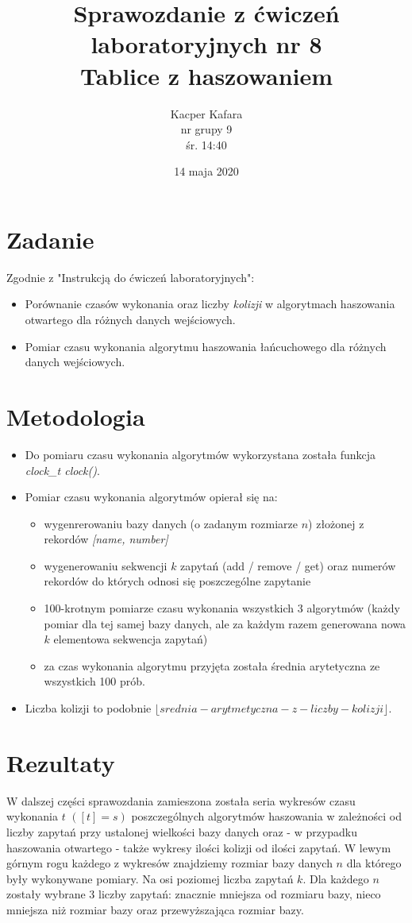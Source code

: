 \documentclass{article}
\title{Sprawozdanie z ćwiczeń laboratoryjnych nr 8\\Tablice z haszowaniem}
\author{Kacper Kafara\\nr grupy 9\\śr. 14:40}
\date{14 maja 2020}
\begin{document}
\maketitle
\newpage

\section{Zadanie}
Zgodnie z "Instrukcją do ćwiczeń laboratoryjnych":
\begin{itemize}
	\item Porównanie czasów wykonania oraz liczby \emph{kolizji} w algorytmach haszowania otwartego dla różnych danych wejściowych. 
	\item Pomiar czasu wykonania algorytmu haszowania łańcuchowego dla różnych danych wejściowych.
\end{itemize}

\section{Metodologia}
\begin{itemize}
	\item Do pomiaru czasu wykonania algorytmów wykorzystana została funkcja \emph{clock\_t clock()}. 
	\item Pomiar czasu wykonania algorytmów opierał się na: 
	\begin{itemize}
		\item wygenrerowaniu bazy danych (o zadanym rozmiarze $n$) złożonej z rekordów \emph{[name, number]}
		\item wygenerowaniu sekwencji $k$ zapytań (add / remove / get) oraz numerów rekordów do których odnosi się poszczególne zapytanie
		\item 100-krotnym pomiarze czasu wykonania wszystkich 3 algorytmów (każdy pomiar dla tej samej bazy danych, ale za każdym razem generowana nowa $k$ elementowa sekwencja zapytań)
		\item za czas wykonania algorytmu przyjęta została średnia arytetyczna ze wszystkich 100 prób. 
	\end{itemize}
	\item Liczba kolizji to podobnie $\lfloor srednia-arytmetyczna-z-liczby-kolizji \rfloor$.
\end{itemize}

\section{Rezultaty}
\indent 
W dalszej części sprawozdania zamieszona została seria wykresów czasu wykonania $t$ $([t] = s)$ poszczególnych algorytmów haszowania w zależności od liczby zapytań przy ustalonej wielkości bazy danych oraz - w przypadku haszowania otwartego - także wykresy ilości kolizji od ilości zapytań. W lewym górnym rogu każdego z wykresów znajdziemy rozmiar bazy danych $n$ dla którego były wykonywane pomiary. Na osi poziomej liczba zapytań $k$. Dla każdego $n$ zostały wybrane 3 liczby zapytań: znacznie mniejsza od rozmiaru bazy, nieco mniejsza niż rozmiar bazy oraz przewyższająca rozmiar bazy. 
\end{document}
